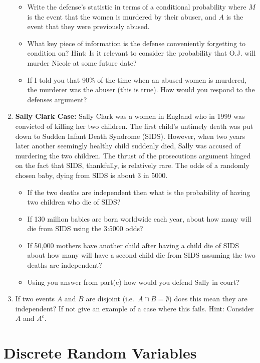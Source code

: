 \documentclass[
]{book}
\providecommand{\tightlist}{%
  \setlength{\itemsep}{0pt}\setlength{\parskip}{0pt}}
\theoremstyle{definition}
\theoremstyle{definition}
\theoremstyle{definition}
\theoremstyle{definition}
\theoremstyle{remark}
\begin{document}
\begin{enumerate}
  \begin{itemize}
  \tightlist
  \item
    Write the defense's statistic in terms of a conditional probability where \(M\) is the event that the women is murdered by their abuser, and \(A\) is the event that they were previously abused.
  \item
    What key piece of information is the defense conveniently forgetting to condition on? Hint: Is it relevant to consider the probability that O.J. will murder Nicole at some future date?
  \item
    If I told you that 90\% of the time when an abused women is murdered, the murderer was the abuser (this is true). How would you respond to the defenses argument?
  \end{itemize}
\item
  \textbf{Sally Clark Case:} Sally Clark was a women in England who in 1999 was convicted of killing her two children. The first child's untimely death was put down to Sudden Infant Death Syndrome (SIDS). However, when two years later another seemingly healthy child suddenly died, Sally was accused of murdering the two children. The thrust of the prosecutions argument hinged on the fact that SIDS, thankfully, is relatively rare. The odds of a randomly chosen baby, dying from SIDS is about 3 in 5000.

  \begin{itemize}
  \tightlist
  \item
    If the two deaths are independent then what is the probability of having two children who die of SIDS?
  \item
    If 130 million babies are born worldwide each year, about how many will die from SIDS using the 3:5000 odds?
  \item
    If 50,000 mothers have another child after having a child die of SIDS about how many will have a second child die from SIDS assuming the two deaths are independent?
  \item
    Using you answer from part(c) how would you defend Sally in court?
  \end{itemize}
\item
  If two events \(A\) and \(B\) are disjoint (i.e.~\(A \cap B=\emptyset\)) does this mean they are independent? If not give an example of a case where this fails. Hint: Consider \(A\) and \(A^c\).
\end{enumerate}

\hypertarget{discrete-random-variables}{%
\chapter{Discrete Random Variables}\label{discrete-random-variables}}
\end{document}
